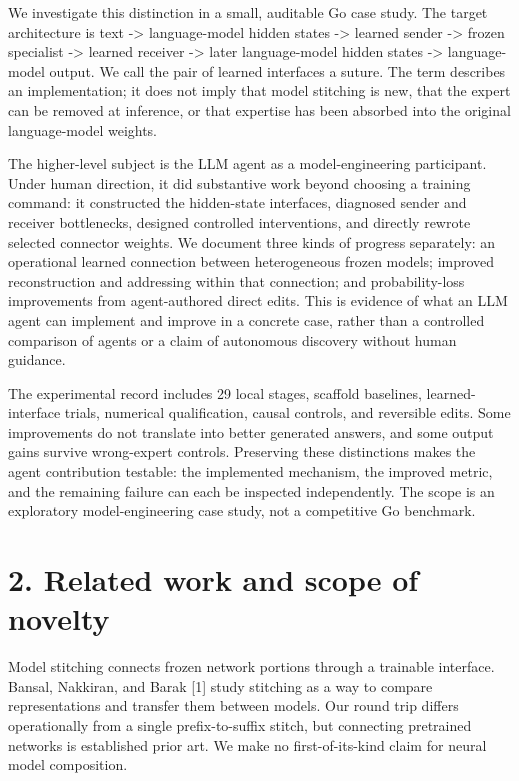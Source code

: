 \documentclass[11pt]{article}
\begin{document}
We investigate this distinction in a small, auditable Go case study. The target architecture is text -> language-model hidden states -> learned sender -> frozen specialist -> learned receiver -> later language-model hidden states -> language-model output. We call the pair of learned interfaces a suture. The term describes an implementation; it does not imply that model stitching is new, that the expert can be removed at inference, or that expertise has been absorbed into the original language-model weights.

The higher-level subject is the LLM agent as a model-engineering participant. Under human direction, it did substantive work beyond choosing a training command: it constructed the hidden-state interfaces, diagnosed sender and receiver bottlenecks, designed controlled interventions, and directly rewrote selected connector weights. We document three kinds of progress separately: an operational learned connection between heterogeneous frozen models; improved reconstruction and addressing within that connection; and probability-loss improvements from agent-authored direct edits. This is evidence of what an LLM agent can implement and improve in a concrete case, rather than a controlled comparison of agents or a claim of autonomous discovery without human guidance.

The experimental record includes 29 local stages, scaffold baselines, learned-interface trials, numerical qualification, causal controls, and reversible edits. Some improvements do not translate into better generated answers, and some output gains survive wrong-expert controls. Preserving these distinctions makes the agent contribution testable: the implemented mechanism, the improved metric, and the remaining failure can each be inspected independently. The scope is an exploratory model-engineering case study, not a competitive Go benchmark.

\section*{2. Related work and scope of novelty}
Model stitching connects frozen network portions through a trainable interface. Bansal, Nakkiran, and Barak [1] study stitching as a way to compare representations and transfer them between models. Our round trip differs operationally from a single prefix-to-suffix stitch, but connecting pretrained networks is established prior art. We make no first-of-its-kind claim for neural model composition.
\end{document}

